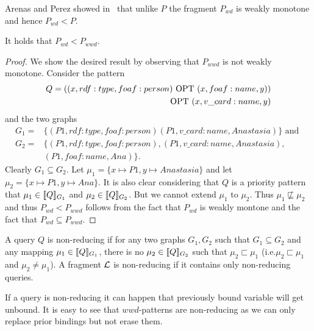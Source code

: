 Arenas and Perez showed in~\cite{arenas2011querying} that unlike $P$ the fragment
$P_{wd}$ is weakly monotone and hence $P_{wd} < P$.

\begin{theorem}
	It holds that $P_{wd} < P_{wwd}$.
\end{theorem}
\begin{proof}
	We show the desired result by observing that $P_{wwd}$ is not weakly
	monotone.
	Consider the pattern
	\begin{align*}
		Q=((x,rdf:type,foaf:person) \mbox{ OPT } (x,foaf:name,y))\\
		\mbox{ OPT } (x,v\_card:name,y)
	\end{align*}
	and the two graphs
	\begin{align*}
		G_1 =& \{(P1,rdf:type,foaf:person) (P1, v\_card:name,Anastasia) \}
		\mbox{ and } \\
		G_2=& \{(P1,rdf:type,foaf:person), (P1, v\_card:name,Anastasia),\\
			&(P1, foaf:name, Ana) \}.
	\end{align*}
	Clearly $G_1 \subseteq G_2$. Let $\mu_1 = \{x \mapsto
	P1, y \mapsto Anastasia\}$ and let $\mu_2 = \{x \mapsto
	P1, y \mapsto Ana\}$. It is also clear considering that $Q$ is a priority
	pattern that $\mu_1 \in \llbracket Q \rrbracket_{G_1}$ and  $\mu_2 \in \llbracket Q \rrbracket_{G_2}$. But
	we cannot extend $\mu_1$ to $\mu_2$. Thus $\mu_1 \not\sqsubseteq \mu_2$ and
	thus $P_{wd} < P_{wwd}$ follows from the fact that $P_{wd}$ is weakly
	montone and the fact that $P_{wd} \subseteq P_{wwd}$.
\end{proof}

\begin{definition}
	A query $Q$ is non-reducing if for any two graphs $G_1,G_2$ such that $G_1
	\subseteq G_2$ and any mapping $\mu_1 \in \llbracket Q \rrbracket_{G_1}$, there is no
	$\mu_2 \in \llbracket Q \rrbracket_{G_2}$ such that $\mu_2 \sqsubset \mu_1$ (i.e.$\mu_2
	\sqsubset \mu_1$ and $\mu_2 \neq \mu_1$).
	A fragment $\mathcal{L}$ is non-reducing if it contains only non-reducing queries.
\end{definition}

If a query is non-reducing it can happen that previously bound variable will get
unbound. It is easy to see that $wwd$-patterns are non-reducing as we can only
replace prior bindings but not erase them.

